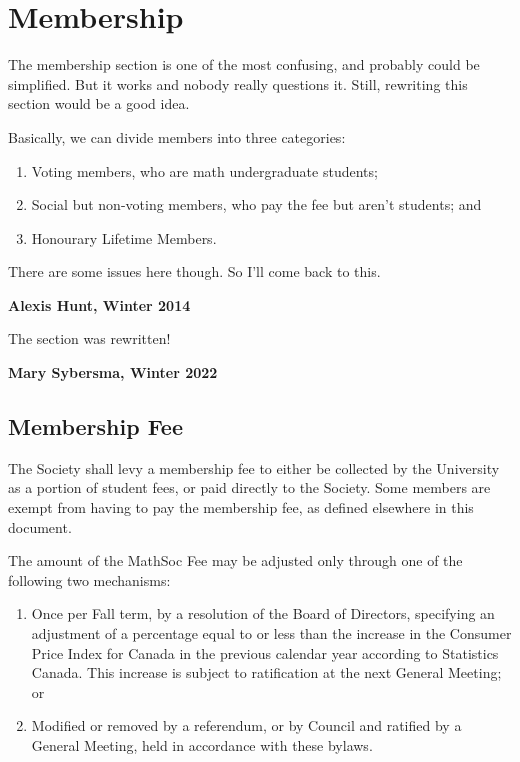 \section{Membership}
\begin{annotation}
The membership section is one of the most confusing, and probably could be
simplified. But it works and nobody really questions it. Still, rewriting this
section would be a good idea.

Basically, we can divide members into three categories:
\begin{enumerate}
  \item Voting members, who are math undergraduate students;
  \item Social but non-voting members, who pay the fee but aren't students; and
  \item Honourary Lifetime Members.
\end{enumerate}
There are some issues here though. So I'll come back to this.

\textbf{Alexis Hunt, Winter 2014}
\end{annotation}

\begin{annotation}
The section was rewritten! 

\textbf{Mary Sybersma, Winter 2022}
\end{annotation}

\subsection{Membership Fee}

The Society shall levy a membership fee to either be collected by the University
as a portion of student fees, or paid directly to the Society. Some members are
exempt from having to pay the membership fee, as defined elsewhere in this
document.

The amount of the MathSoc Fee may be adjusted only through one of the following two mechanisms:
\begin{enumerate}
    \item Once per Fall term, by a resolution of the Board of Directors,
        specifying an adjustment of a percentage equal to or less than the
        increase in the Consumer Price Index for Canada in the previous
        calendar year according to Statistics Canada. This increase is subject
        to ratification at the next General Meeting; or 
    \item Modified or removed by a referendum, or by Council and ratified by a General Meeting, held in accordance with these bylaws.
\end{enumerate}


